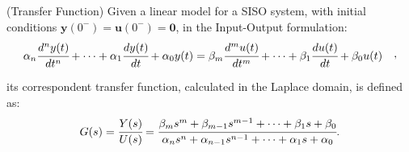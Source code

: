 \documentclass[a4paper,11pt]{book}
\numberwithin{figure}{chapter}
\numberwithin{equation}{chapter}
\numberwithin{table}{chapter}
\theoremstyle{definition}
\newtheorem{definition}{Definition}[chapter]
\newcounter{boxed-theorem}
\newcounter{boxed-lemma}
\newcounter{boxed-definition}
\newenvironment{boxed-definition}[1]
{\colorlet{shadecolor}{pastelYellow!15} \begin{shaded} \begin{definition}{#1}}
{\end{definition} \end{shaded}}
\newcounter{boxed-example}
\begin{document}
\begin{boxed-definition}{(Transfer Function)} \label{th:transFun01}
    Given a linear model for a SISO system, with initial conditions $\bm{y}(0^-) = \bm{u}(0^-) = \bm{0}$, in the Input-Output formulation:
    \begin{equation}
    \begin{split}
        \alpha_n \cfrac{d^n y(t)}{dt^n} + \cdots + \alpha_{1} \cfrac{d y(t)}{dt} + \alpha_{0} y(t) &= \beta_m \cfrac{d^m u(t)}{dt^m} + \cdots + \beta_{1} \cfrac{d u(t)}{dt} + \beta_{0} u(t)
    \end{split}
    ,\end{equation}
    
\noindent its correspondent transfer function, calculated in the Laplace domain, is defined as:
    \begin{equation} \label{eq:transFun01}
         G(s) = \cfrac{Y(s)}{U(s)} = \cfrac{\beta_m s^m + \beta_{m-1} s^{m-1} + \cdots + \beta_{1} s + \beta_0}{\alpha_n s^n + \alpha_{n-1} s^{n-1} + \cdots + \alpha_{1} s + \alpha_0}
    .\end{equation}
\end{boxed-definition}
\end{document}
